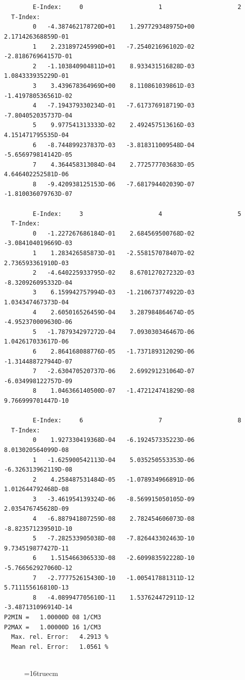 \documentclass[12pt,dvipdfmx]{article}
\begin{document}
\begin{small}\begin{verbatim}


        E-Index:     0                     1                     2
  T-Index:
        0   -4.387462178720D+01    1.297729348975D+00    2.171426368859D-01
        1    2.231897245990D+01   -7.254021696102D-02   -2.818676964157D-01
        2   -1.103840904811D+01    8.933431516828D-03    1.084333935229D-01
        3    3.439678364969D+00    8.110861039861D-03   -1.419780536561D-02
        4   -7.194379330234D-01   -7.617376918719D-03   -7.804052035737D-04
        5    9.977541313333D-02    2.492457513616D-03    4.151471795535D-04
        6   -8.744899237837D-03   -3.818311009548D-04   -5.656979814142D-05
        7    4.364458313084D-04    2.772577703683D-05    4.646402252581D-06
        8   -9.420938125153D-06   -7.681794402039D-07   -1.810036079763D-07

        E-Index:     3                     4                     5
  T-Index:
        0   -1.227267686184D-01    2.684569500768D-02   -3.084104019669D-03
        1    1.283426585873D-01   -2.558157078407D-02    2.736593361910D-03
        2   -4.640225933795D-02    8.670127027232D-03   -8.320926095332D-04
        3    6.159942757994D-03   -1.210673774922D-03    1.034347467373D-04
        4    2.605016526459D-04    3.287984864674D-05   -4.952370009630D-06
        5   -1.787934297272D-04    7.093030346467D-06    1.042617033617D-06
        6    2.864168088776D-05   -1.737189312029D-06   -1.314488727944D-07
        7   -2.630470520737D-06    2.699291231064D-07   -6.034998122757D-09
        8    1.046366140500D-07   -1.472124741829D-08    9.766999701447D-10

        E-Index:     6                     7                     8
  T-Index:
        0    1.927330419368D-04   -6.192457335223D-06    8.013020564099D-08
        1   -1.625900542113D-04    5.035250553353D-06   -6.326313962119D-08
        2    4.258487531484D-05   -1.078934966891D-06    1.012644792468D-08
        3   -3.461954139324D-06   -8.569915050105D-09    2.035476745628D-09
        4   -6.887941807259D-08    2.782454606073D-08   -8.823571239501D-10
        5   -7.282533905038D-08   -7.826443302463D-10    9.734519877427D-11
        6    1.515466306533D-08   -2.609983592228D-10   -5.766562927060D-12
        7   -2.777752615430D-10   -1.005417881311D-12    5.711155616810D-13
        8   -4.089947705610D-11    1.537624472911D-12   -3.487131096914D-14
P2MIN =   1.00000D 08 1/CM3
P2MAX =   1.00000D 16 1/CM3
  Max. rel. Error:   4.2913 %
  Mean rel. Error:   1.0561 %


\end{verbatim}\end{small}
\begin{figure} \label{2.2d}
\epsfxsize=16truecm
\end{figure}
\newpage
\end{document}
